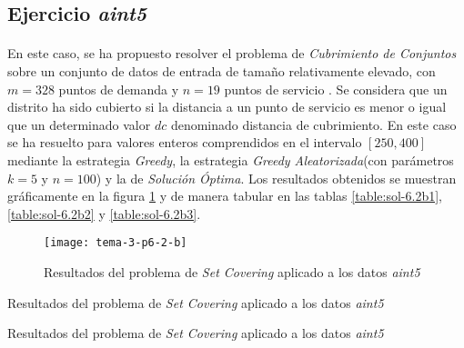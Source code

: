 \documentclass[spanish]{article}
\begin{document}
		\subsection{Ejercicio \emph{aint5}}
		\label{sec:e-6.2b}

		\paragraph{}
		En este caso, se ha propuesto resolver el problema de \emph{Cubrimiento de Conjuntos} sobre un conjunto de datos de entrada de tamaño relativamente elevado, con $m = 328$ puntos de demanda y $n=19$ puntos de servicio . Se considera que un distrito ha sido cubierto si la distancia a un punto de servicio es menor o igual que un determinado valor $dc$ denominado distancia de cubrimiento. En este caso se ha resuelto para valores enteros comprendidos en el intervalo $[250, 400]$ mediante la estrategia \emph{Greedy}, la estrategia \emph{Greedy Aleatorizada}(con parámetros $k=5$ y $n=100$)  y la de \emph{Solución Óptima}. Los resultados obtenidos se muestran gráficamente en la figura \ref{fig:sol-6.2b} y de manera tabular en las tablas \ref{table:sol-6.2b1}, \ref{table:sol-6.2b2} y \ref{table:sol-6.2b3}.

			\begin{figure}[h]
				\begin{center}
					\texttt{[image: tema-3-p6-2-b]}
				\end{center}
				\caption{Resultados del problema de \emph{Set Covering} aplicado a los datos \emph{aint5}}
				\label{fig:sol-6.2b}
			\end{figure}

			\begin{table}[h]
				\begin{center}
				\end{center}
				\caption{Resultados del problema de \emph{Set Covering} aplicado a los datos \emph{aint5}}
				\label{table:sol-6.2b1}
			\end{table}

			\begin{table}[h]
				\begin{center}
				\end{center}
				\caption{Resultados del problema de \emph{Set Covering} aplicado a los datos \emph{aint5}}
				\label{table:sol-6.2b2}
			\end{table}
\end{document}
